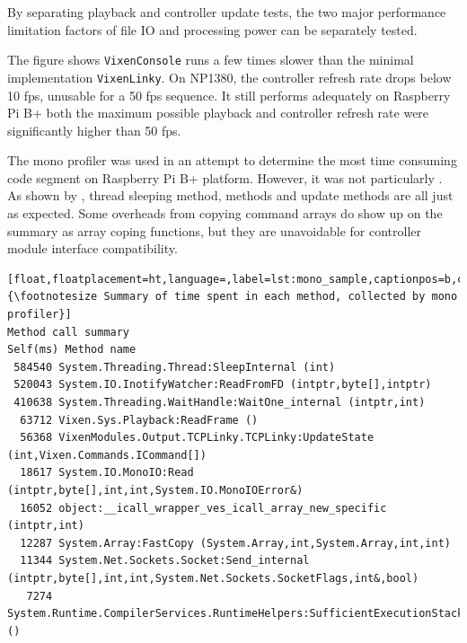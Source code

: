 By separating playback and controller update tests, the two major performance limitation factors of file IO and processing power can be separately tested.

The figure shows  \texttt{VixenConsole} runs a few times slower than the minimal implementation \texttt{VixenLinky}. On NP1380, the controller refresh rate drops below 10 fps, unusable for a 50 fps sequence. It still performs adequately on Raspberry Pi B+\ca{;} both the maximum possible playback and controller refresh rate were significantly higher than 50 fps.

The mono profiler was used in an attempt to determine the most time consuming code segment on Raspberry Pi B+ platform. However, it was not particularly . As shown by ,  thread sleeping method,  methods and update methods are all  just as expected. Some overheads from copying command arrays do show up on the summary as array coping functions, but they are  unavoidable for controller module interface compatibility.


\begin{lstlisting}[float,floatplacement=ht,language=,label=lst:mono_sample,captionpos=b,caption={\footnotesize Summary of time spent in each method, collected by mono profiler}]
Method call summary
Self(ms) Method name
 584540 System.Threading.Thread:SleepInternal (int)
 520043 System.IO.InotifyWatcher:ReadFromFD (intptr,byte[],intptr)
 410638 System.Threading.WaitHandle:WaitOne_internal (intptr,int)
  63712 Vixen.Sys.Playback:ReadFrame ()
  56368 VixenModules.Output.TCPLinky.TCPLinky:UpdateState (int,Vixen.Commands.ICommand[])
  18617 System.IO.MonoIO:Read (intptr,byte[],int,int,System.IO.MonoIOError&)
  16052 object:__icall_wrapper_ves_icall_array_new_specific (intptr,int)
  12287 System.Array:FastCopy (System.Array,int,System.Array,int,int)
  11344 System.Net.Sockets.Socket:Send_internal (intptr,byte[],int,int,System.Net.Sockets.SocketFlags,int&,bool)
   7274 System.Runtime.CompilerServices.RuntimeHelpers:SufficientExecutionStack ()
\end{lstlisting}
